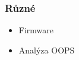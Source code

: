 


\subtitle{XIII. FW a OOPS}
\date{17. 12. 2013}



\begin{frame}
  \titlepage
\end{frame}

\begin{frame}
  \frametitle{Různé}

  \begin{itemize}
  \item Firmware
  \item Analýza OOPS
  \end{itemize}

\end{frame}





